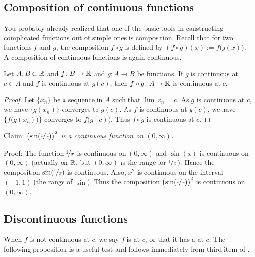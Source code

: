 \subsection{Composition of continuous functions}

You probably already realized that one of the basic tools in
constructing complicated functions out of simple ones is composition.
Recall that for two functions $f$ and $g$,
the composition $f \circ g$ is defined by
$(f \circ g)(x) := f\bigl(g(x)\bigr)$.
A composition of
continuous functions is again
continuous.

\begin{prop} \label{prop:compositioncont}
Let $A, B \subset {\mathbb{R}}$ and $f \colon B \to {\mathbb{R}}$ and $g \colon A \to B$ be
functions.  If $g$ is continuous at $c \in A$ and
$f$ is continuous at $g(c)$, then $f \circ g \colon A \to {\mathbb{R}}$ is continuous
at $c$.
\end{prop}

\begin{proof}
Let $\{ x_n \}$ be a sequence in $A$ such that $\lim\, x_n = c$.
As $g$ is continuous at $c$, we have $\bigl\{ g(x_n) \bigr\}$ converges to $g(c)$.
As $f$ is continuous at $g(c)$, we have $\bigl\{ f\bigl(g(x_n)\bigr) \bigr\}$ converges
to $f\bigl(g(c)\bigr)$.
Thus $f \circ g$ is continuous at $c$.
\end{proof}

\begin{example}
Claim: \emph{${\bigl(\sin(\nicefrac{1}{x})\bigr)}^2$ is a continuous
function on $(0,\infty)$.}

Proof: The function $\nicefrac{1}{x}$ is continuous on
$(0,\infty)$ and $\sin(x)$ is continuous on $(0,\infty)$ (actually
on ${\mathbb{R}}$, but $(0,\infty)$ is the range for $\nicefrac{1}{x}$).
Hence the composition $\sin(\nicefrac{1}{x})$ is continuous.  Also,
$x^2$ is continuous on the interval $(-1,1)$ (the range of $\sin$).  Thus
the composition
${\bigl(\sin(\nicefrac{1}{x})\bigr)}^2$ is continuous on $(0,\infty)$.
\end{example}

\subsection{Discontinuous functions}

When $f$ is not continuous at $c$, we
say $f$ is \emph{} at $c$, or that it has a
\emph{} at $c$.
The following proposition is a useful test and follows immediately
from third item of .

